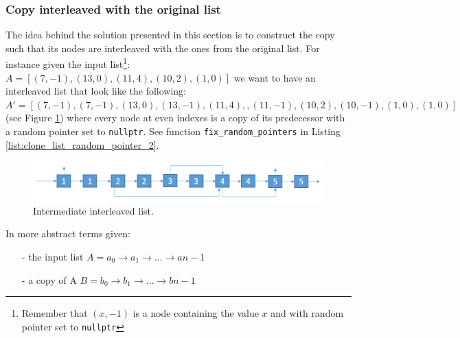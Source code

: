 \subsubsection{Copy interleaved with the original list}
The idea behind the solution presented in this section is to construct the copy such that its nodes are interleaved with the ones from the original list. For instance given the input list\footnote{Remember that $(x,-1)$ is a node containing the value $x$ and with random pointer set to \lstinline[columns=fixed]{nullptr}}: $A = [(7,-1),(13,0),(11,4),(10,2),(1,0)]$ we want to have an interleaved list that look like the following: $A' = [(7,-1),(7,-1),(13,0),(13,-1),(11,4),,(11,-1),(10,2),(10,-1),(1,0),(1,0)]$ (see Figure \ref{fig:clone_list_random_pointer:interleaved}) where every node at even indexes is a copy of its predecessor with a random pointer set to \lstinline[columns=fixed]{nullptr}.  See function \lstinline[columns=fixed]{fix_random_pointers} in Listing \ref{list:clone_list_random_pointer_2}.


\begin{figure}
	\label{fig:clone_list_random_pointer:interleaved}
	\centering
	\includegraphics[scale=0.5]{sources/clone_list_random_pointer/images/random_list_2}
	\caption{Intermediate interleaved list.}
\end{figure}


In more abstract terms given:
\begin{itemize}
	\item[-] the input list  $A= a_0 \rightarrow a_1 \rightarrow \ldots \rightarrow a{n-1}$
	\item[-] a copy of A  $B = b_0 \rightarrow b_1 \rightarrow \ldots \rightarrow b{n-1}$ 
\end{itemize}

